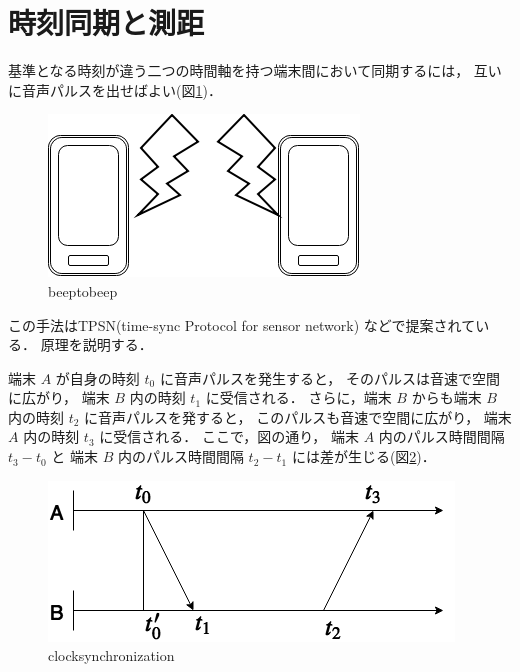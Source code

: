 

\section{時刻同期と測距}

基準となる時刻が違う二つの時間軸を持つ端末間において同期するには，
互いに音声パルスを出せばよい(図\ref{fig:beeptobeep})．

\begin{figure}[tb]\centering
  \hspace{-2mm}\includegraphics[clip,width=1.1\hsize]{img/beeptobeep.png}
  \caption{beeptobeep}\label{fig:beeptobeep}
\end{figure}

この手法はTPSN(time-sync Protocol for sensor network)\cite{tpsn}
などで提案されている．
原理を説明する．

端末 $A$ が自身の時刻 $t_0$ に音声パルスを発生すると，
そのパルスは音速で空間に広がり，
端末 $B$ 内の時刻 $t_1$ に受信される．
さらに，端末 $B$ からも端末 $B$ 内の時刻 $t_2$ に音声パルスを発すると，
このパルスも音速で空間に広がり，
端末 $A$ 内の時刻 $t_3$ に受信される．
ここで，図の通り，
端末 $A$ 内のパルス時間間隔 $t_3-t_0$ と
端末 $B$ 内のパルス時間間隔 $t_2-t_1$ には差が生じる(図\ref{fig:clocksynchronization})．

\begin{figure}[tb]\centering
  \hspace{-2mm}\includegraphics[clip,width=1.1\hsize]{img/clock_synchronization.png}
  \caption{clocksynchronization}\label{fig:clocksynchronization}
\end{figure}

